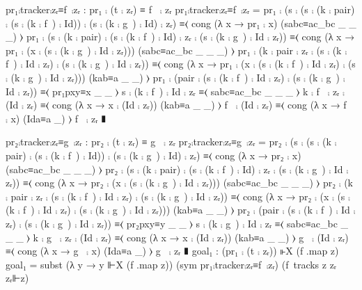                  pr₁⨾tracker⨾zᵣ≡f~⨾zᵣ : pr₁ ⨾ (t ⨾ zᵣ) ≡ f~ ⨾ zᵣ
                 pr₁⨾tracker⨾zᵣ≡f~⨾zᵣ =
                         pr₁ ⨾ (s ⨾ (s ⨾ (k ⨾ pair) ⨾ (s ⨾ (k ⨾ f~) ⨾ Id)) ⨾ (s ⨾ (k ⨾ g~) ⨾ Id) ⨾ zᵣ)
                           ≡⟨ cong (λ x → pr₁ ⨾ x) (sabc≡ac_bc _ _ _) ⟩
                         pr₁ ⨾ (s ⨾ (k ⨾ pair) ⨾ (s ⨾ (k ⨾ f~) ⨾ Id) ⨾ zᵣ ⨾ (s ⨾ (k ⨾ g~) ⨾ Id ⨾ zᵣ))
                           ≡⟨ cong (λ x → pr₁ ⨾ (x ⨾ (s ⨾ (k ⨾ g~) ⨾ Id ⨾ zᵣ))) (sabc≡ac_bc _ _ _) ⟩
                         pr₁ ⨾ (k ⨾ pair ⨾ zᵣ ⨾ (s ⨾ (k ⨾ f~) ⨾ Id ⨾ zᵣ) ⨾ (s ⨾ (k ⨾ g~) ⨾ Id ⨾ zᵣ))
                           ≡⟨ cong (λ x → pr₁ ⨾ (x ⨾ (s ⨾ (k ⨾ f~) ⨾ Id ⨾ zᵣ) ⨾ (s ⨾ (k ⨾ g~) ⨾ Id ⨾ zᵣ))) (kab≡a _ _) ⟩
                         pr₁ ⨾ (pair ⨾ (s ⨾ (k ⨾ f~) ⨾ Id ⨾ zᵣ) ⨾ (s ⨾ (k ⨾ g~) ⨾ Id ⨾ zᵣ))
                           ≡⟨ pr₁pxy≡x _ _ ⟩
                         s ⨾ (k ⨾ f~) ⨾ Id ⨾ zᵣ
                           ≡⟨ sabc≡ac_bc _ _ _ ⟩
                         k ⨾ f~ ⨾ zᵣ ⨾ (Id ⨾ zᵣ)
                           ≡⟨ cong (λ x → x ⨾ (Id ⨾ zᵣ)) (kab≡a _ _) ⟩
                         f~ ⨾ (Id ⨾ zᵣ)
                           ≡⟨ cong (λ x → f~ ⨾ x) (Ida≡a _) ⟩
                         f~ ⨾ zᵣ
                           ∎

                 pr₂⨾tracker⨾zᵣ≡g~⨾zᵣ : pr₂ ⨾ (t ⨾ zᵣ) ≡ g~ ⨾ zᵣ
                 pr₂⨾tracker⨾zᵣ≡g~⨾zᵣ =
                         pr₂ ⨾ (s ⨾ (s ⨾ (k ⨾ pair) ⨾ (s ⨾ (k ⨾ f~) ⨾ Id)) ⨾ (s ⨾ (k ⨾ g~) ⨾ Id) ⨾ zᵣ)
                           ≡⟨ cong (λ x → pr₂ ⨾ x) (sabc≡ac_bc _ _ _) ⟩
                         pr₂ ⨾ (s ⨾ (k ⨾ pair) ⨾ (s ⨾ (k ⨾ f~) ⨾ Id) ⨾ zᵣ ⨾ (s ⨾ (k ⨾ g~) ⨾ Id ⨾ zᵣ))
                           ≡⟨ cong (λ x → pr₂ ⨾ (x ⨾ (s ⨾ (k ⨾ g~) ⨾ Id ⨾ zᵣ))) (sabc≡ac_bc _ _ _) ⟩
                         pr₂ ⨾ (k ⨾ pair ⨾ zᵣ ⨾ (s ⨾ (k ⨾ f~) ⨾ Id ⨾ zᵣ) ⨾ (s ⨾ (k ⨾ g~) ⨾ Id ⨾ zᵣ))
                           ≡⟨ cong (λ x → pr₂ ⨾ (x ⨾ (s ⨾ (k ⨾ f~) ⨾ Id ⨾ zᵣ) ⨾ (s ⨾ (k ⨾ g~) ⨾ Id ⨾ zᵣ))) (kab≡a _ _) ⟩
                         pr₂ ⨾ (pair ⨾ (s ⨾ (k ⨾ f~) ⨾ Id ⨾ zᵣ) ⨾ (s ⨾ (k ⨾ g~) ⨾ Id ⨾ zᵣ))
                           ≡⟨ pr₂pxy≡y _ _ ⟩
                         s ⨾ (k ⨾ g~) ⨾ Id ⨾ zᵣ
                           ≡⟨ sabc≡ac_bc _ _ _ ⟩
                         k ⨾ g~ ⨾ zᵣ ⨾ (Id ⨾ zᵣ)
                           ≡⟨ cong (λ x → x ⨾ (Id ⨾ zᵣ)) (kab≡a _ _) ⟩
                         g~ ⨾ (Id ⨾ zᵣ)
                           ≡⟨ cong (λ x → g~ ⨾ x) (Ida≡a _) ⟩
                         g~ ⨾ zᵣ
                           ∎ 
                 goal₁ : (pr₁ ⨾ (t ⨾ zᵣ)) ⊩X (f .map z)
                 goal₁ = subst (λ y → y ⊩X (f .map z)) (sym pr₁⨾tracker⨾zᵣ≡f~⨾zᵣ) (f~tracks z zᵣ zᵣ⊩z)
  
